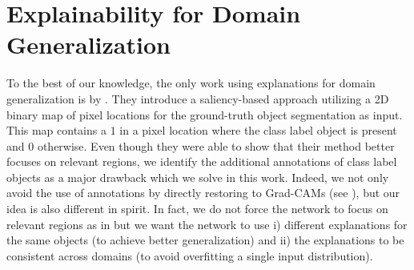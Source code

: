 \section{Explainability for Domain Generalization}

To the best of our knowledge, the only work using explanations for domain generalization is by \citet{zunino2020explainable}. They introduce a saliency-based approach utilizing a 2D binary map of pixel locations for the ground-truth object segmentation as input. This map contains a $1$ in a pixel location where the class label object is present and $0$ otherwise. Even though they were able to show that their method better focuses on relevant regions, we identify the additional annotations of class label objects as a major drawback which we solve in this work. Indeed, we not only avoid the use of annotations by directly restoring to Grad-CAMs (see ), but our idea is also different in spirit. In fact, we do not force the network to focus on relevant regions as in \cite{zunino2020explainable} but we want the network to use i) different explanations for the same objects (to achieve better generalization) and ii) the explanations to be consistent across domains (to avoid overfitting a single input distribution).